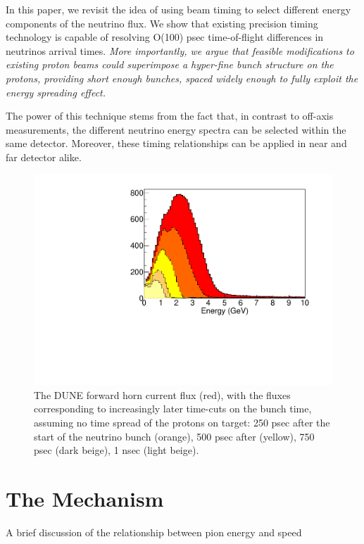 \documentclass[preprint,12pt]{elsarticle}
\begin{document}
In this paper, we revisit the idea of using beam timing to select different energy components of the neutrino flux. We show that existing precision timing technology is capable of resolving O(100) psec time-of-flight differences in neutrinos arrival times. {\it More importantly, we argue that feasible modifications to existing proton beams could superimpose a hyper-fine bunch structure on the protons, providing short enough bunches, spaced widely enough to fully exploit the energy spreading effect.}

The power of this technique stems from the fact that, in contrast to off-axis measurements, the different neutrino energy spectra can be selected within the same detector. Moreover, these timing relationships can be applied in near and far detector alike.

\begin{figure}[t]
	\begin{center}
           	\includegraphics[width=0.45 \linewidth]{Figures/10.10.18_LBNFtiming/DUNEbeam_truetimingB.pdf}
	\end{center}
	\caption{The DUNE forward horn current flux (red), with the fluxes corresponding to increasingly later time-cuts on the bunch time, assuming no time spread of the protons on target: 250 psec after the start of the neutrino bunch (orange), 500 psec after (yellow), 750 psec (dark beige), 1 nsec (light beige).}
		\label{fig:anniedetector}
\end{figure}


\section{The Mechanism}

A brief discussion of the relationship between pion energy and speed
\end{document}
